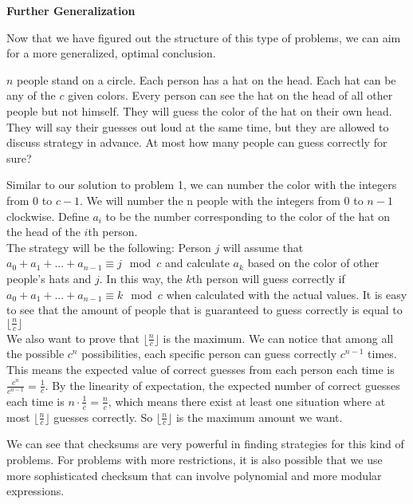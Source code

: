 \noindent	
\textbf{Further Generalization}

	Now that we have figured out the structure of this type of problems, we can aim for a more generalized, optimal conclusion.
	\begin{problem}
		$n$ people stand on a circle. Each person has a hat on the head. Each hat can be any of the $c$ given colors. Every person can see the hat on the head of all other people but not himself. They will guess the color of the hat on their own head. They will say their guesses out loud at the same time, but they are allowed to discuss strategy in advance. At most how many people can guess correctly for sure?
	\end{problem}
	\begin{solution}
		Similar to our solution to problem 1, we can number the color with the integers from 0 to $c-1$. We will number the n people with the integers from 0 to $n-1$ clockwise. Define $a_i$  to be the number corresponding to the color of the hat on the head of the $i$th person. \\
		The strategy will be the following: Person $j$ will assume that $a_0+a_1+...+a_{n-1} \equiv j \mod c$ and calculate $a_k$ based on the color of other people's hats and $j$. In this way, the $k$th person will guess correctly if $a_0+a_1+...+a_{n-1} \equiv k \mod c$ when calculated with the actual values. It is easy to see that the amount of people that is guaranteed to guess correctly is equal to $\lfloor \frac{n}{c} \rfloor$\\
		We also want to prove that $\lfloor \frac{n}{c} \rfloor$ is the maximum. We can notice that among all the possible $c^n$ possibilities, each specific person can guess correctly $c^{n-1}$ times. This means the expected value of correct guesses from each person each time is $\frac{c^n}{c^{n-1}} = \frac{1}{c}$. By the linearity of expectation, the expected number of correct guesses each time is $n \cdot \frac{1}{c} = \frac{n}{c}$, which means there exist at least one situation where at most $\lfloor \frac{n}{c} \rfloor$ guesses correctly. So $\lfloor \frac{n}{c} \rfloor$ is the maximum amount we want.
	\end{solution}
	\indent We can see that checksums are very powerful in finding strategies for this kind of problems. For problems with more restrictions, it is also possible that we use more sophisticated checksum that can involve polynomial and more modular expressions.
